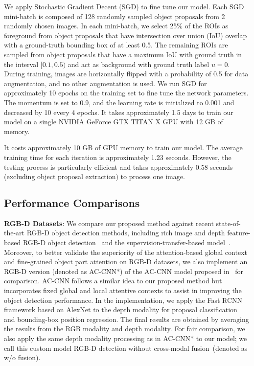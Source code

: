 \documentclass[journal]{IEEEtran}
\begin{document}
We apply Stochastic Gradient Decent (SGD) to fine tune our model. Each SGD mini-batch is composed of 128 randomly sampled object proposals from 2 randomly chosen images. In each mini-batch, we select 25\% of the ROIs as foreground from object proposals that have intersection over union (IoU) overlap with a ground-truth bounding box of at least 0.5. The remaining ROIs are sampled from object proposals that have a maximum IoU with ground truth in the interval $[0.1, 0.5)$ and act as background with ground truth label $u = 0$. During training, images are horizontally flipped with a probability of 0.5 for data augmentation, and no other augmentation is used. We run SGD for approximately 10 epochs on the training set to fine tune the network parameters. The momentum is set to 0.9, and the learning rate is initialized to 0.001 and decreased by 10 every 4 epochs. It takes approximately 1.5 days to train our model on a single NVIDIA GeForce GTX TITAN X GPU with 12 GB of memory. 

It costs approximately 10 GB of GPU memory to train our model. The average training time for each iteration is approximately 1.23 seconds. However, the testing process is particularly efficient and takes approximately 0.58 seconds (excluding object proposal extraction) to process one image. 


\subsection{Performance Comparisons}
\textbf{RGB-D Datasets}: We compare our proposed method against recent state-of-the-art RGB-D object detection methods, including rich image and depth feature-based RGB-D object detection~\cite{gupta2014learning} and the supervision-transfer-based model~\cite{gupta2016cross}. Moreover, to better validate the superiority of the attention-based global context and fine-grained object part attention on RGB-D datasets, we also implement an RGB-D version (denoted as AC-CNN*) of the AC-CNN model proposed in~\cite{li2016attentive} for comparison. AC-CNN follows a similar idea to our proposed method but incorporates fixed global and local attentive contexts to assist in improving the object detection performance. In the implementation, we apply the Fast RCNN \cite{fast-rcnn} framework based on AlexNet \cite{alexnet} to the depth modality for proposal classification and bounding-box position regression. The final results are obtained by averaging the results from the RGB modality and depth modality. For fair comparison, we also apply the same depth modality processing as in AC-CNN* to our model; we call this custom model RGB-D detection without cross-modal fusion~(denoted as w/o fusion).
\end{document}
